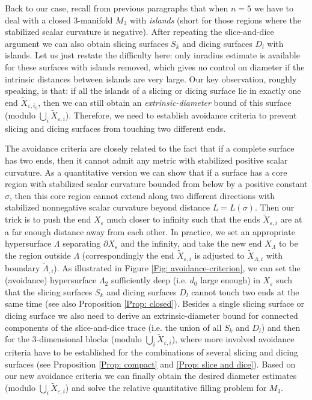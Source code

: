 \documentclass[11pt,letterpaper]{amsart}
\numberwithin{equation}{section}
\theoremstyle{definition}
\newcommand{\ve}{\varepsilon}
\begin{document}
Back to our case, recall from previous paragraphs that when $n=5$ we have to deal with a closed $3$-manifold $M_3$ with \emph{islands} (short for those regions where the stabilized scalar curvature is negative). After repeating the slice-and-dice argument we can also obtain slicing surfaces $S_k$ and dicing surfaces $D_l$ with islands. Let us just restate the difficulty here: only inradius estimate is available for these surfaces with islands removed, which gives no control on diameter if the intrinsic distances between islands are very large. Our key observation, roughly speaking, is that: if all the islands of a slicing or dicing surface lie in exactly one end $\tilde X_{\ve,i_0}$, then we can still obtain an \emph{extrinsic-diameter} bound of this surface (modulo $\bigcup_i\tilde X_{\ve,i}$). Therefore, we need to establish avoidance criteria to prevent slicing and dicing surfaces from touching two different ends.

The avoidance criteria are closely related to the fact that if a complete surface has two ends, then it cannot admit any metric with stabilized positive scalar curvature. As a quantitative version we can show that if a surface has a core region with stabilized scalar curvature bounded from below by a positive constant $\sigma$, then this core region cannot extend along two different directions with stabilized nonnegative scalar curvature beyond distance $L=L(\sigma)$. Then our trick is to push the end $X_\ve$ much closer to infinity such that the ends $\tilde X_{\ve,i}$ are at a far enough distance away from each other. In practice, we set an appropriate hypersurface $\Lambda$ separating $\partial X_\ve$ and the infinity, and take the new end  $X_\Lambda$ to be the region outside $\Lambda$ (correspondingly the end $\tilde X_{\ve,i}$ is adjusted to $\tilde X_{\Lambda,i}$ with boundary $\tilde \Lambda_{,i}$).
As illustrated in Figure \ref{Fig: avoidance-criterion}, we can set the (avoidance) hypersurface $\Lambda_2$ sufficiently deep (i.e. $d_0$ large enough) in $X_\ve$ such that the slicing surfaces $S_k$ and dicing surfaces $D_l$ cannot touch two ends at the same time (see also Proposition \ref{Prop: closed}). Besides a single slicing surface or dicing surface we also need to derive an extrinsic-diameter bound for connected components of the slice-and-dice trace (i.e. the union of all $S_k$ and $D_l$) and then for the $3$-dimensional blocks (modulo $\bigcup_i\tilde X_{\ve,i}$), where more involved avoidance criteria have to be established for the combinations of several slicing and dicing surfaces
 (see Proposition \ref{Prop: compact} and \ref{Prop: slice and dice}).
Based on our new avoidance criteria we can finally obtain the desired diameter estimates (modulo $\bigcup_i\tilde X_{\ve,i}$) and solve the relative quantitative filling problem for $M_3$.
\end{document}
